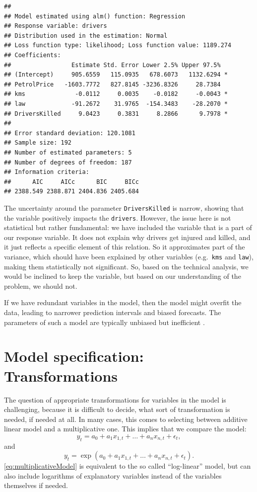 \documentclass[
]{book}
\theoremstyle{definition}
\theoremstyle{definition}
\theoremstyle{definition}
\theoremstyle{definition}
\theoremstyle{remark}
\begin{document}
\begin{verbatim}
## 
## Model estimated using alm() function: Regression
## Response variable: drivers
## Distribution used in the estimation: Normal
## Loss function type: likelihood; Loss function value: 1189.274
## Coefficients:
##                 Estimate Std. Error Lower 2.5% Upper 97.5%  
## (Intercept)     905.6559   115.0935   678.6073   1132.6294 *
## PetrolPrice   -1603.7772   827.8145 -3236.8326     28.7384  
## kms              -0.0112     0.0035    -0.0182     -0.0043 *
## law             -91.2672    31.9765  -154.3483    -28.2070 *
## DriversKilled     9.0423     0.3831     8.2866      9.7978 *
## 
## Error standard deviation: 120.1081
## Sample size: 192
## Number of estimated parameters: 5
## Number of degrees of freedom: 187
## Information criteria:
##      AIC     AICc      BIC     BICc 
## 2388.549 2388.871 2404.836 2405.684
\end{verbatim}

The uncertainty around the parameter \texttt{DriversKilled} is narrow, showing that the variable positively impacts the \texttt{drivers}. However, the issue here is not statistical but rather fundamental: we have included the variable that is a part of our response variable. It does not explain why drivers get injured and killed, and it just reflects a specific element of this relation. So it approximates part of the variance, which should have been explained by other variables (e.g.~\texttt{kms} and \texttt{law}), making them statistically not significant. So, based on the technical analysis, we would be inclined to keep the variable, but based on our understanding of the problem, we should not.

If we have redundant variables in the model, then the model might overfit the data, leading to narrower prediction intervals and biased forecasts. The parameters of such a model are typically unbiased but inefficient \citep[Section 4.3 of][]{SvetunkovSBA}.

\hypertarget{diagnosticsTransformations}{%
\section{Model specification: Transformations}\label{diagnosticsTransformations}}

The question of appropriate transformations for variables in the model is challenging, because it is difficult to decide, what sort of transformation is needed, if needed at all. In many cases, this comes to selecting between additive linear model and a multiplicative one. This implies that we compare the model:
\begin{equation}
    y_t = a_0 + a_1 x_{1,t} + \dots + a_n x_{n,t} + \epsilon_t,
  \label{eq:additiveModel}
\end{equation}
and
\begin{equation}
    y_t = \exp\left(a_0 + a_1 x_{1,t} + \dots + a_n x_{n,t} + \epsilon_t\right) .
  \label{eq:multiplicativeModel}
\end{equation}
\eqref{eq:multiplicativeModel} is equivalent to the so called ``log-linear'' model, but can also include logarithms of explanatory variables instead of the variables themselves if needed.
\end{document}
